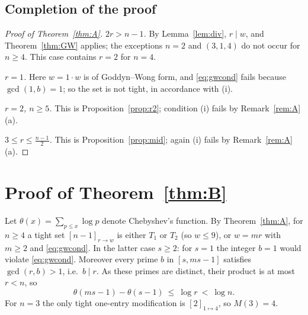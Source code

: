 \documentclass[11pt]{article}
\theoremstyle{definition}
\begin{document}
\subsection{Completion of the proof}

\begin{proof}[Proof of Theorem~\ref{thm:A}]
\emph{$2r>n-1$.} By Lemma~\ref{lem:div}, $r\mid w$, and
Theorem~\ref{thm:GW} applies; the exceptions $n=2$ and $(3,1,4)$ do not
occur for $n\ge4$. This case contains $r=2$ for $n=4$.

\emph{$r=1$.} Here $w=1\cdot w$ is of Goddyn--Wong form, and
\eqref{eq:gwcond} fails because $\gcd(1,b)=1$; so the set is not tight,
in accordance with (i).

\emph{$r=2$, $n\ge5$.} This is Proposition~\ref{prop:r2}; condition (i)
fails by Remark~\ref{rem:A}(a).

\emph{$3\le r\le\frac{n-1}2$.} This is Proposition~\ref{prop:mid};
again (i) fails by Remark~\ref{rem:A}(a).
\end{proof}

\section{Proof of Theorem~\ref{thm:B}}\label{sec:thmB}

Let $\theta(x)=\sum_{p\le x}\log p$ denote Chebyshev's function. By
Theorem~\ref{thm:A}, for $n\ge4$ a tight set $[n-1]_{r\to w}$ is either
$T_1$ or $T_2$ (so $w\le9$), or $w=mr$ with $m\ge2$ and
\eqref{eq:gwcond}. In the latter case $s\ge2$: for $s=1$ the integer
$b=1$ would violate \eqref{eq:gwcond}. Moreover every prime $b$ in
$[s,ms-1]$ satisfies $\gcd(r,b)>1$, i.e.\ $b\mid r$. As these primes are
distinct, their product is at most $r<n$, so
\begin{equation}\label{eq:theta}
\theta(ms-1)-\theta(s-1)\ \le\ \log r\ <\ \log n .
\end{equation}
For $n=3$ the only tight one-entry modification is $[2]_{1\mapsto4}$,
so $M(3)=4$.
\end{document}
